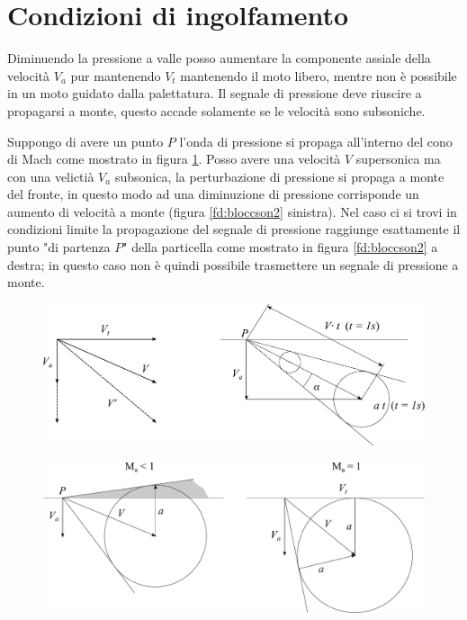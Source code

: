 \section{Condizioni di ingolfamento}
Diminuendo la pressione a valle posso aumentare la componente assiale della velocità $V_a$ pur mantenendo $V_t$ mantenendo il moto libero, mentre non è possibile in un moto guidato dalla palettatura. Il segnale di pressione deve riuscire a propagarsi a monte, questo accade solamente se le velocità sono subsoniche. 

Suppongo di avere un punto $P$ l'onda di pressione si propaga all'interno del cono di Mach come mostrato in figura \ref{fd:bloccson1}. Posso avere una velocità $V$ supersonica ma con una velictià $V_a$ subsonica, la perturbazione di pressione si propaga a monte del fronte, in questo modo ad una diminuzione di pressione corrisponde un aumento di velocità a monte (figura \ref{fd:bloccson2} sinistra). Nel caso ci si trovi in condizioni limite la propagazione del segnale di pressione raggiunge esattamente il punto "di partenza $P$" della particella come mostrato in figura \ref{fd:bloccson2} a destra; in questo caso non è quindi possibile trasmettere un segnale di pressione a monte. 
\begin{figure}
\centering
  \includegraphics[width=.8\textwidth]{fig/bloccson1.pdf}
\caption{}
\label{fd:bloccson1}
\end{figure}
\begin{figure}
\centering
  \includegraphics[width=.8\textwidth]{fig/bloccson2.pdf}
\caption{}
\label{fig:bloccson2}
\end{figure}
